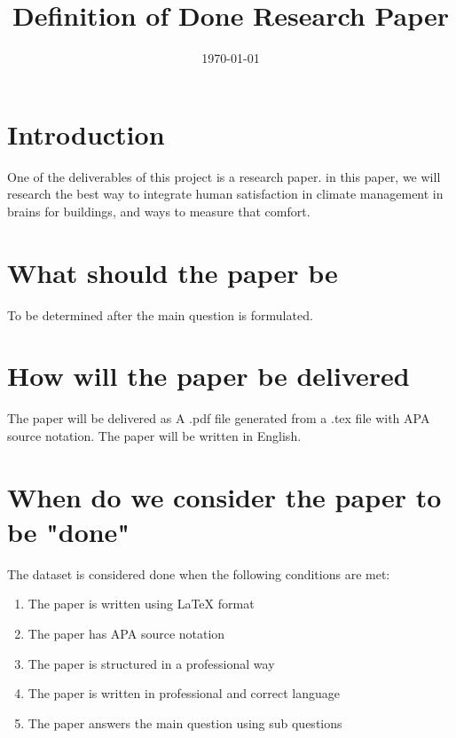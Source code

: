 \documentclass[12pt, letterpaper]{article}
\begin{document}
	
	\title{Definition of Done Research Paper}
	\author{}
	\date{\today}
	
	
	\maketitle
	
	\newpage
	
	\section{Introduction}
	One of the deliverables of this project is a research paper. in this paper, we will research the best way to integrate human satisfaction in climate management in brains for buildings, and ways to measure that comfort.
	
	\section{What should the paper be}
	To be determined after the main question is formulated.
	
	\section{How will the paper be delivered}
	The paper will be delivered as A .pdf file generated from a .tex file with APA source notation. The paper will be written in English.
	
	\section{When do we consider the paper to be "done"}
	The dataset is considered done when the following conditions are met:
	\begin{enumerate}
		\item The paper is written using LaTeX format
		\item The paper has APA source notation
		\item The paper is structured in a professional way
		\item The paper is written in professional and correct language  
		\item The paper answers the main question using sub questions
	\end{enumerate}
	
	
\end{document}
